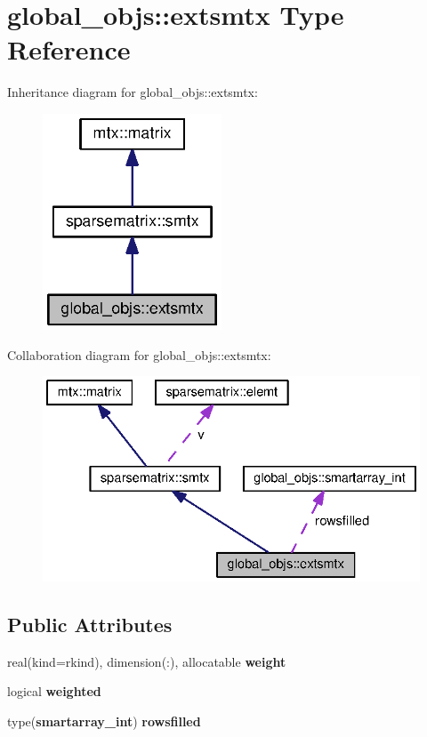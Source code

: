 \section{global\+\_\+objs\+:\+:extsmtx Type Reference}
\label{structglobal__objs_1_1extsmtx}


Inheritance diagram for global\+\_\+objs\+:\+:extsmtx\+:\nopagebreak
\begin{figure}[H]
\begin{center}
\leavevmode
\includegraphics[width=151pt]{structglobal__objs_1_1extsmtx__inherit__graph}
\end{center}
\end{figure}


Collaboration diagram for global\+\_\+objs\+:\+:extsmtx\+:\nopagebreak
\begin{figure}[H]
\begin{center}
\leavevmode
\includegraphics[width=331pt]{structglobal__objs_1_1extsmtx__coll__graph}
\end{center}
\end{figure}
\subsection*{Public Attributes}
\begin{DoxyCompactItemize}
\item 
real(kind=rkind), dimension(\+:), allocatable {\bf weight}
\item 
logical {\bf weighted}
\item 
type({\bf smartarray\+\_\+int}) {\bf rowsfilled}
\end{DoxyCompactItemize}
